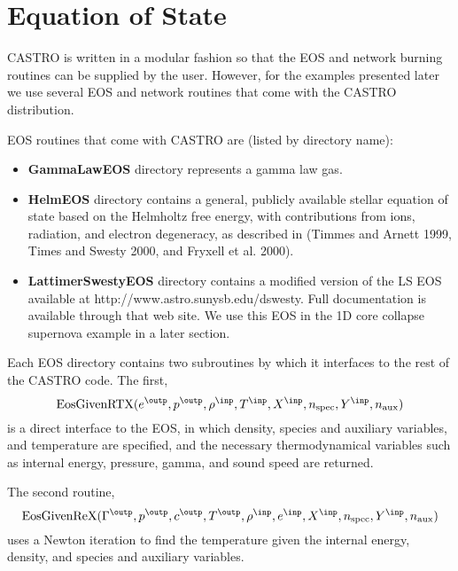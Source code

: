 \section{Equation of State}
CASTRO is written in a modular fashion so that the EOS and network
burning routines can be supplied by the user.   However, for the
examples presented later we use several EOS and network routines
that come with the CASTRO distribution.  

EOS routines that come with CASTRO are (listed by directory name):
\begin{itemize}
\item {\bf GammaLawEOS} directory represents a gamma law gas.
\item {\bf HelmEOS} directory contains a general, publicly available
stellar equation of state based on the Helmholtz free energy,
with contributions from ions, radiation, and electron degeneracy, as
described in (Timmes and Arnett 1999, Times and Swesty 2000, and Fryxell et al. 2000).
\item {\bf LattimerSwestyEOS} directory contains a modified version of the
LS EOS available at http://www.astro.sunysb.edu/dswesty.  Full
documentation is available through that web site.  We use this EOS
in the 1D core collapse supernova example in a later section.
\end{itemize}

Each EOS directory contains two subroutines by which it interfaces to
the rest of the CASTRO code.  The first, 
\[
{\bf \rm EosGivenRTX}(e^\outp, p^\outp, \rho^\inp, T^\inp, X^\inp, n_{\rm spec}, Y^\inp, n_{\rm aux})
\]
is a direct interface to the EOS, in which density, species and auxiliary variables,
and temperature are specified, and the necessary thermodynamical variables such as 
internal energy, pressure, gamma, and sound speed are returned.

The second routine, 
\[
{\bf \rm EosGivenReX}(\Gamma^\outp, p^\outp, c^\outp, T^\outp, \rho^\inp, e^\inp, X^\inp, n_{\rm spec}, Y^\inp, n_{\rm aux})
\]
uses a Newton iteration to find the temperature given
the internal energy, density, and species and auxiliary variables.  

